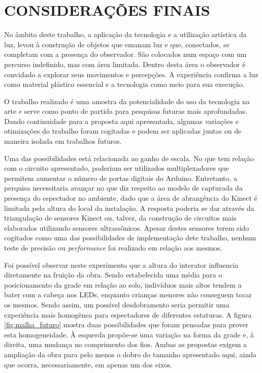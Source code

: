 \chapter{CONSIDERAÇÕES FINAIS}

No âmbito deste trabalho, a aplicação da tecnologia e a utilização artística da luz, levou à construção de objetos que emanam luz e que, conectados, se completam com a presença do observador. São colocados num espaço com um percurso indefinido, mas com área limitada. Dentro desta área o observador é convidado a explorar seus movimentos e percepções. A experiência confirma a luz como material plástico essencial e a tecnologia como meio para sua execução.

O trabalho realizado é uma amostra da potencialidade do uso da tecnologia na arte e serve como ponto de partida para pesquisas futuras mais aprofundadas. Dando continuidade para a proposta aqui apresentada, algumas variações e otimizações do trabalho foram cogitadas e podem ser aplicadas juntas ou de maneira isolada em trabalhos futuros.

Uma das possibilidades está relacionada ao ganho de escala. No que tem relação com o circuito apresentado, poderiam ser utilizados multiplexadores que permitem aumentar o número de portas digitais do Arduino. Entretanto, a perquisa necessitaria avançar no que diz respeito ao modelo de capturada da presença do espectador no ambiente, dado que a área de abrangência do Kinect é limitada pela altura do local da instalação. A resposta poderia se dar através da triangulação de sensores Kinect ou, talvez, da construção de circuitos mais elaborados utilizando sensores ultrassônicos. Apesar destes sensores terem sido cogitados como uma das possibilidades de implementação dete trabalho, nenhum teste de precisão ou \textit{performance} foi realizado em relação aos mesmos.

Foi possível observar neste experimento que a altura do interator influencia diretamente na fruição da obra. Sendo estabelecida uma média para o posicionamento da grade em relação ao solo, indivíduos mais altos tendem a bater com a cabeça nos LEDs, enquanto crianças menores não conseguem tocar os mesmos. Sendo assim, um possível desdobramento seria permitir uma experiência mais homogênea para espectadores de diferentes estaturas. A figura \ref{fig:malha_futuro} mostra duas possibilidades que foram pensadas para prover esta homogeneidade. À esquerda propõe-se uma variação na forma da grade e, à direita, uma mudança no comprimento dos fios. Ambas as propostas exigem a ampliação da obra para pelo menos o dobro do tamanho apresentado aqui, ainda que ocorra, necessariamente, em apenas um dos eixos. 

